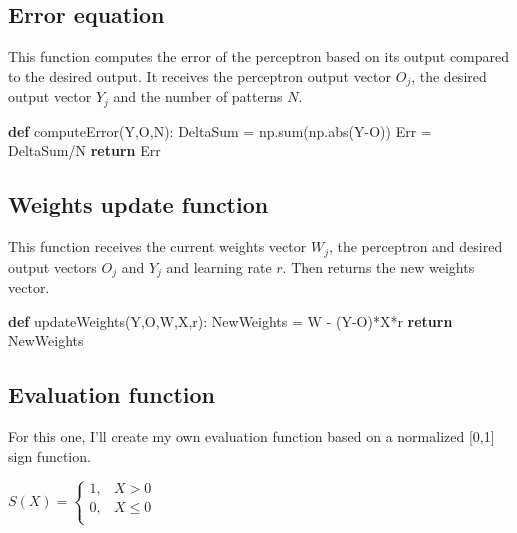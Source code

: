 \documentclass[
  letterpaper,
  DIV=11,
  numbers=noendperiod]{scrartcl}
\newenvironment{Shaded}{\begin{snugshade}}{\end{snugshade}}
\newcommand{\BuiltInTok}[1]{\textcolor[rgb]{0.00,0.23,0.31}{#1}}
\newcommand{\ControlFlowTok}[1]{\textcolor[rgb]{0.00,0.23,0.31}{\textbf{#1}}}
\newcommand{\KeywordTok}[1]{\textcolor[rgb]{0.00,0.23,0.31}{\textbf{#1}}}
\newcommand{\NormalTok}[1]{\textcolor[rgb]{0.00,0.23,0.31}{#1}}
\newcommand{\OperatorTok}[1]{\textcolor[rgb]{0.37,0.37,0.37}{#1}}
\begin{document}
\subsection{Error equation}\label{error-equation}

This function computes the error of the perceptron based on its output
compared to the desired output. It receives the perceptron output vector
\(O_j\), the desired output vector \(Y_j\) and the number of patterns
\(N\).

\begin{Shaded}
\begin{Highlighting}[]
\KeywordTok{def}\NormalTok{ computeError(Y,O,N):}
\NormalTok{  DeltaSum }\OperatorTok{=}\NormalTok{ np.}\BuiltInTok{sum}\NormalTok{(np.}\BuiltInTok{abs}\NormalTok{(Y}\OperatorTok{{-}}\NormalTok{O))}
\NormalTok{  Err }\OperatorTok{=}\NormalTok{ DeltaSum}\OperatorTok{/}\NormalTok{N}
  \ControlFlowTok{return}\NormalTok{ Err}
\end{Highlighting}
\end{Shaded}

\subsection{Weights update function}\label{weights-update-function}

This function receives the current weights vector \(W_j\), the
perceptron and desired output vectors \(O_j\) and \(Y_j\) and learning
rate \(r\). Then returns the new weights vector.

\begin{Shaded}
\begin{Highlighting}[]
\KeywordTok{def}\NormalTok{ updateWeights(Y,O,W,X,r):}
\NormalTok{  NewWeights }\OperatorTok{=}\NormalTok{ W }\OperatorTok{{-}}\NormalTok{ (Y}\OperatorTok{{-}}\NormalTok{O)}\OperatorTok{*}\NormalTok{X}\OperatorTok{*}\NormalTok{r}
  \ControlFlowTok{return}\NormalTok{  NewWeights}
\end{Highlighting}
\end{Shaded}

\subsection{Evaluation function}\label{evaluation-function}

For this one, I'll create my own evaluation function based on a
normalized {[}0,1{]} sign function.

\(S(X) = \begin{cases}
  1, &X >     0\\
  0, &X \leq  0\\
\end{cases}\)
\end{document}
